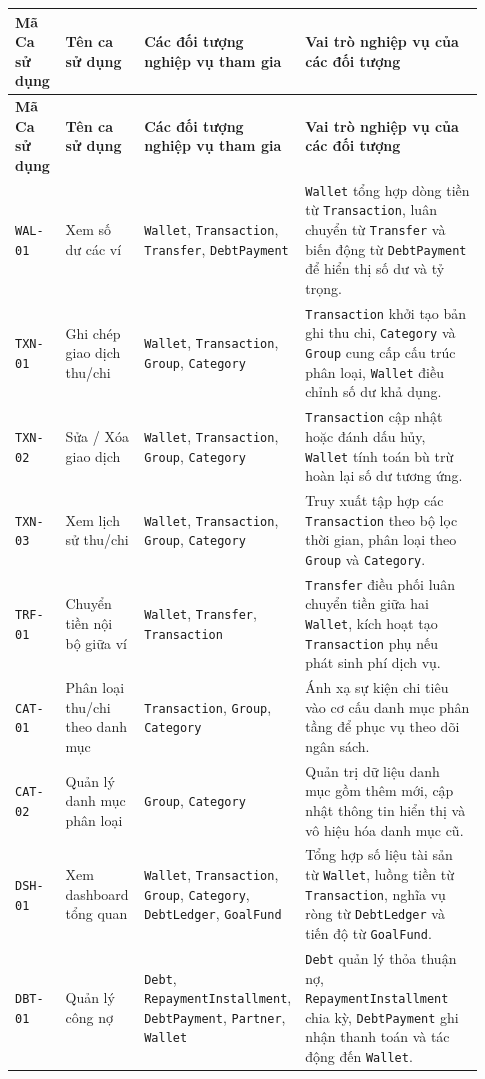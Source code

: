 \documentclass[11pt,a4paper]{article}
\newcommand{\code}[1]{\texttt{#1}}
\newcommand{\lthead}[1]{%
  \hline#1\\\hline\endfirsthead
  \hline#1\\\hline\endhead
}
\newenvironment{smalltable}{\begingroup\footnotesize\renewcommand{\arraystretch}{1.25}\setlength{\tabcolsep}{3pt}}{\endgroup}
\begin{document}
\begin{smalltable}
\begin{longtable}{|L{0.11\linewidth}|L{0.17\linewidth}|L{0.24\linewidth}|L{0.41\linewidth}|}
\lthead{\textbf{Mã Ca sử dụng} & \textbf{Tên ca sử dụng} & \textbf{Các đối tượng nghiệp vụ tham gia} & \textbf{Vai trò nghiệp vụ của các đối tượng}}
\code{WAL-01} & Xem số dư các ví & \code{Wallet}, \code{Transaction}, \code{Transfer}, \code{DebtPayment} & \code{Wallet} tổng hợp dòng tiền từ \code{Transaction}, luân chuyển từ \code{Transfer} và biến động từ \code{DebtPayment} để hiển thị số dư và tỷ trọng. \\ \hline
\code{TXN-01} & Ghi chép giao dịch thu/chi & \code{Wallet}, \code{Transaction}, \code{Group}, \code{Category} & \code{Transaction} khởi tạo bản ghi thu chi, \code{Category} và \code{Group} cung cấp cấu trúc phân loại, \code{Wallet} điều chỉnh số dư khả dụng. \\ \hline
\code{TXN-02} & Sửa / Xóa giao dịch & \code{Wallet}, \code{Transaction}, \code{Group}, \code{Category} & \code{Transaction} cập nhật hoặc đánh dấu hủy, \code{Wallet} tính toán bù trừ hoàn lại số dư tương ứng. \\ \hline
\code{TXN-03} & Xem lịch sử thu/chi & \code{Wallet}, \code{Transaction}, \code{Group}, \code{Category} & Truy xuất tập hợp các \code{Transaction} theo bộ lọc thời gian, phân loại theo \code{Group} và \code{Category}. \\ \hline
\code{TRF-01} & Chuyển tiền nội bộ giữa ví & \code{Wallet}, \code{Transfer}, \code{Transaction} & \code{Transfer} điều phối luân chuyển tiền giữa hai \code{Wallet}, kích hoạt tạo \code{Transaction} phụ nếu phát sinh phí dịch vụ. \\ \hline
\code{CAT-01} & Phân loại thu/chi theo danh mục & \code{Transaction}, \code{Group}, \code{Category} & Ánh xạ sự kiện chi tiêu vào cơ cấu danh mục phân tầng để phục vụ theo dõi ngân sách. \\ \hline
\code{CAT-02} & Quản lý danh mục phân loại & \code{Group}, \code{Category} & Quản trị dữ liệu danh mục gồm thêm mới, cập nhật thông tin hiển thị và vô hiệu hóa danh mục cũ. \\ \hline
\code{DSH-01} & Xem dashboard tổng quan & \code{Wallet}, \code{Transaction}, \code{Group}, \code{Category}, \code{DebtLedger}, \code{GoalFund} & Tổng hợp số liệu tài sản từ \code{Wallet}, luồng tiền từ \code{Transaction}, nghĩa vụ ròng từ \code{DebtLedger} và tiến độ từ \code{GoalFund}. \\ \hline
\code{DBT-01} & Quản lý công nợ & \code{Debt}, \code{RepaymentInstallment}, \code{DebtPayment}, \code{Partner}, \code{Wallet} & \code{Debt} quản lý thỏa thuận nợ, \code{RepaymentInstallment} chia kỳ, \code{DebtPayment} ghi nhận thanh toán và tác động đến \code{Wallet}. \\ \hline

\end{longtable}
\end{smalltable}
\end{document}
